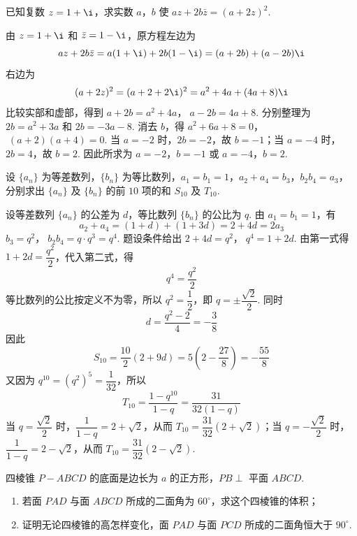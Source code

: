 \begin{problem}
已知复数 \(z = 1 + \i\)，求实数 \(a\)，\(b\) 使 \(az + 2b\bar{z} = (a + 2z)^{2}\).
\end{problem}

\begin{solution}
由 \(z=1+\i\) 和 \(\bar z=1-\i\)，原方程左边为
\[
az+2b\bar z=a(1+\i)+2b(1-\i)=(a+2b)+(a-2b)\i
\]
右边为
\[
(a+2z)^2=(a+2+2\i)^2=a^2+4a+(4a+8)\i
\]
比较实部和虚部，得到
\(a+2b=a^2+4a\)，\(\; a-2b=4a+8\).
分别整理为 \(2b=a^2+3a\) 和 \(2b=-3a-8\). 消去 \(b\)，得
\(a^2+6a+8=0\)，\(\; (a+2)(a+4)=0\).
当 \(a=-2\) 时，\(2b=-2\)，故 \(b=-1\)；当 \(a=-4\) 时，\(2b=4\)，故 \(b=2\). 因此所求为 \(a=-2\)，\(b=-1\) 或 \(a=-4\)，\(b=2\).
\end{solution}

\begin{problem}
设 \(\{a_{n}\}\) 为等差数列，\(\{b_{n}\}\) 为等比数列，\(a_{1} = b_{1} = 1\)，\(a_{2} + a_{4} = b_{3}\)，\(b_{2}b_{4} = a_{3}\)，分别求出 \(\{a_{n}\}\) 及 \(\{b_{n}\}\) 的前 \(10\) 项的和 \(S_{10}\) 及 \(T_{10}\).
\end{problem}

\begin{solution}
设等差数列 \(\{a_n\}\) 的公差为 \(d\)，等比数列 \(\{b_n\}\) 的公比为 \(q\). 由 \(a_1=b_1=1\)，有
\[
a_2+a_4=(1+d)+(1+3d)=2+4d=2a_3
\]
\(b_3=q^2\)，\(\; b_2b_4=q\cdot q^3=q^4\).
题设条件给出
\(2+4d=q^2\)，\(\; q^4=1+2d\).
由第一式得 \(1+2d=\dfrac{q^2}{2}\)，代入第二式，得
\[
q^4=\frac{q^2}{2}
\]
等比数列的公比按定义不为零，所以 \(q^2=\dfrac12\)，即 \(q=\pm\dfrac{\sqrt2}{2}\). 同时
\[
d=\frac{q^2-2}{4}=-\frac38
\]
因此
\[
S_{10}=\frac{10}{2}\left(2+9d\right)=5\left(2-\frac{27}{8}\right)=-\frac{55}{8}
\]
又因为 \(q^{10}=(q^2)^5=\dfrac1{32}\)，所以
\[
T_{10}=\frac{1-q^{10}}{1-q}=\frac{31}{32(1-q)}
\]
当 \(q=\dfrac{\sqrt2}{2}\) 时，\(\dfrac1{1-q}=2+\sqrt2\)，从而 \(T_{10}=\dfrac{31}{32}(2+\sqrt2)\)；当 \(q=-\dfrac{\sqrt2}{2}\) 时，\(\dfrac1{1-q}=2-\sqrt2\)，从而 \(T_{10}=\dfrac{31}{32}(2-\sqrt2)\).
\end{solution}

\begin{problem}
四棱锥 \(P - ABCD\) 的底面是边长为 \(a\) 的正方形，\(PB \perp\) 平面 \(ABCD\).
\begin{enumerate}
\item 若面 \(PAD\) 与面 \(ABCD\) 所成的二面角为 \(60^{\circ}\)，求这个四棱锥的体积；
\item 证明无论四棱锥的高怎样变化，面 \(PAD\) 与面 \(PCD\) 所成的二面角恒大于 \(90^{\circ}\).
\end{enumerate}

\end{problem}

